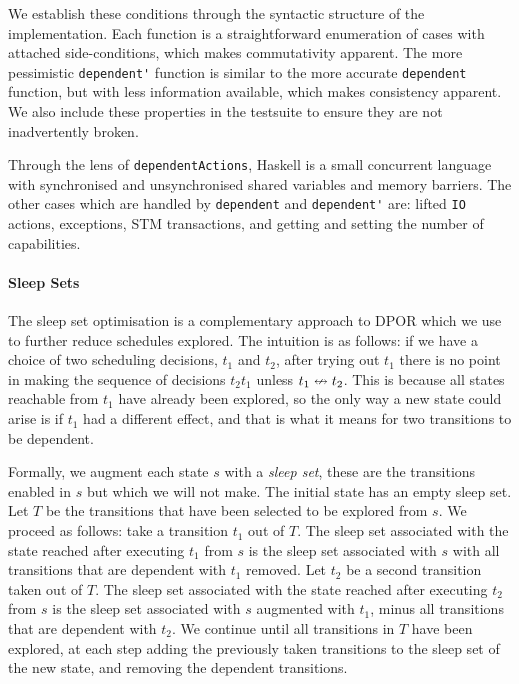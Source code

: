 We establish these conditions through the syntactic structure of the
implementation.  Each function is a straightforward enumeration of
cases with attached side-conditions, which makes commutativity
apparent.  The more pessimistic \verb|dependent'| function is similar
to the more accurate \verb|dependent| function, but with less
information available, which makes consistency apparent.  We also
include these properties in the \dejafu{} testsuite to ensure they are
not inadvertently broken.

Through the lens of \verb|dependentActions|, Haskell is a small
concurrent language with synchronised and unsynchronised shared
variables and memory barriers.  The other cases which are handled by
\verb|dependent| and \verb|dependent'| are: lifted \verb|IO| actions,
exceptions, STM transactions, and getting and setting the number of
capabilities.

\paragraph{Sleep Sets}
The sleep set optimisation is a complementary approach to
DPOR\cite{flanagan2005,godefroid1996} which we use to further reduce
schedules explored.  The intuition is as follows: if we have a choice
of two scheduling decisions, $t_{1}$ and $t_{2}$, after trying out
$t_{1}$ there is no point in making the sequence of decisions
$t_{2}t_{1}$ unless $t_{1} \nleftrightarrow t_{2}$.  This is because all
states reachable from $t_{1}$ have already been explored, so the only
way a new state could arise is if $t_{1}$ had a different effect, and
that is what it means for two transitions to be dependent.

Formally, we augment each state $s$ with a \emph{sleep set}, these are
the transitions enabled in $s$ but which we will not make.  The
initial state has an empty sleep set.  Let $T$ be the transitions that
have been selected to be explored from $s$.  We proceed as follows:
take a transition $t_{1}$ out of $T$.  The sleep set associated with
the state reached after executing $t_{1}$ from $s$ is the sleep set
associated with $s$ with all transitions that are dependent with
$t_{1}$ removed.  Let $t_{2}$ be a second transition taken out of $T$.
The sleep set associated with the state reached after executing
$t_{2}$ from $s$ is the sleep set associated with $s$ augmented with
$t_{1}$, minus all transitions that are dependent with $t_{2}$.  We
continue until all transitions in $T$ have been explored, at each step
adding the previously taken transitions to the sleep set of the new
state, and removing the dependent transitions.

